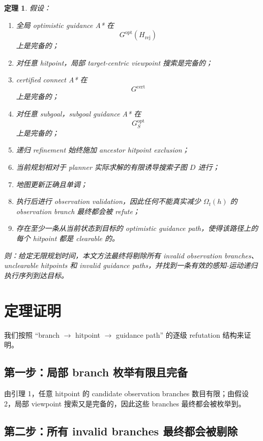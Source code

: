 \documentclass[11pt]{ctexart}
\newtheorem{theorem}{定理}
\begin{document}
\begin{theorem}
假设：
\begin{enumerate}[leftmargin=2em]
    \item 全局 optimistic guidance A* 在
    \[
    G^{\mathrm{opt}}(H_{\mathrm{rej}})
    \]
    上是完备的；
    \item 对任意 hitpoint，局部 target-centric viewpoint 搜索是完备的；
    \item certified connect A* 在
    \[
    G^{\mathrm{cert}}
    \]
    上是完备的；
    \item 对任意 subgoal，subgoal guidance A* 在
    \[
    G^{\mathrm{opt}}_S
    \]
    上是完备的；
    \item 递归 refinement 始终施加 ancestor hitpoint exclusion；
    \item 当前规划相对于 planner 实际求解的有限诱导搜索子图 $D$ 进行；
    \item 地图更新正确且单调；
    \item 执行后进行 observation validation，因此任何不能真实减少 $\Omega_t(h)$ 的 observation branch 最终都会被 refute；
    \item 存在至少一条从当前状态到目标的 optimistic guidance path，使得该路径上的每个 hitpoint 都是 clearable 的。
\end{enumerate}
则：给定无限规划时间，本文方法最终将剔除所有 invalid observation branches、unclearable hitpoints 和 invalid guidance paths，并找到一条有效的感知-运动递归执行序列到达目标。
\end{theorem}

\section{定理证明}

我们按照 “branch $\rightarrow$ hitpoint $\rightarrow$ guidance path” 的逐级 refutation 结构来证明。

\subsection*{第一步：局部 branch 枚举有限且完备}

由引理 1，任意 hitpoint 的 candidate observation branches 数目有限；由假设 2，局部 viewpoint 搜索又是完备的，因此这些 branches 最终都会被枚举到。

\subsection*{第二步：所有 invalid branches 最终都会被剔除}
\end{document}
